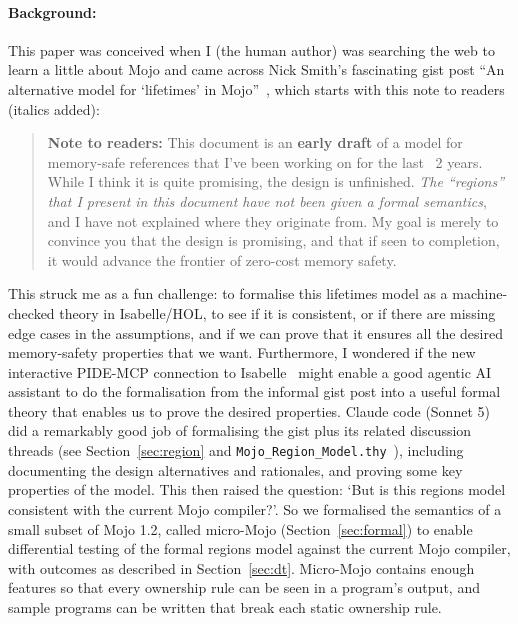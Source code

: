 \documentclass[11pt,a4paper]{article}
\newcommand{\code}[1]{\texttt{#1}}
\begin{document}
\paragraph{Background:}
This paper was conceived when I (the human author) was searching the web to
learn a little about Mojo and came across Nick Smith's fascinating gist post
``An alternative model for `lifetimes' in Mojo''~\cite{smith-gist}, which
starts with this note to readers (italics added):
\begin{quote}
  \textbf{Note to readers:} This document is an \textbf{early draft} of a model for
  memory-safe references that I've been working on for the last ~2 years.
  While I think it is quite promising, the design is unfinished.
  \emph{The ``regions'' that I present in this document have not been given a
  formal semantics}, and I have not explained where they originate from.
  My goal is merely to convince you that the design is promising,
  and that if seen to completion, it would advance the frontier of
  zero-cost memory safety.
\end{quote}
This struck me as a fun challenge: to formalise this lifetimes model
as a machine-checked theory in Isabelle/HOL, to see if it is consistent,
or if there are missing edge cases in the assumptions, and if we can prove
that it ensures all the desired memory-safety properties that we want.
Furthermore, I wondered if the new interactive PIDE-MCP connection to
Isabelle~\cite{pide_mcp_code} might enable a good agentic AI assistant
to do the formalisation from the informal gist post into a useful formal
theory that enables us to prove the desired properties.  Claude code
(Sonnet 5) did a remarkably good job of formalising the gist plus its
related discussion threads (see Section~\ref{sec:region} and
\code{Mojo\_Region\_Model.thy}~\cite{mojo-semantics}),
including documenting the design alternatives and rationales, and
proving some key properties of the model.
This then raised the question: `But is this regions model
consistent with the current Mojo compiler?'.
So we formalised the semantics of a small subset of Mojo 1.2, called
micro-Mojo (Section~\ref{sec:formal})
to enable differential testing of the formal regions model against the current
Mojo compiler, with outcomes as described in Section~\ref{sec:dt}.
Micro-Mojo contains enough features so that every ownership rule can be seen
in a program's output, and sample programs can be written that break each
static ownership rule.
\end{document}
